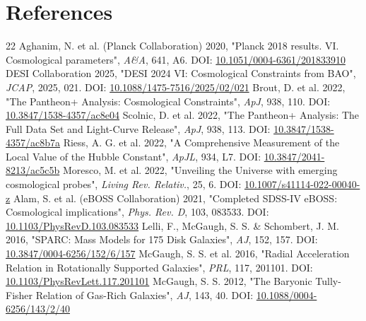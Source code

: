 \documentclass[11pt,a4paper]{article}
\begin{document}
\section{References}
\begin{thebibliography}{22}
 Aghanim, N. et al. (Planck Collaboration) 2020, "Planck 2018 results. VI. Cosmological parameters", \emph{A\&A}, 641, A6. DOI: \href{https://doi.org/10.1051/0004-6361/201833910}{10.1051/\allowbreak{}0004-6361/\allowbreak{}201833910}
 DESI Collaboration 2025, "DESI 2024 VI: Cosmological Constraints from BAO", \emph{JCAP}, 2025, 021. DOI: \href{https://doi.org/10.1088/1475-7516/2025/02/021}{10.1088/\allowbreak{}1475-7516/\allowbreak{}2025/\allowbreak{}02/\allowbreak{}021}
 Brout, D. et al. 2022, "The Pantheon+ Analysis: Cosmological Constraints", \emph{ApJ}, 938, 110. DOI: \href{https://doi.org/10.3847/1538-4357/ac8e04}{10.3847/\allowbreak{}1538-4357/\allowbreak{}ac8e04}
 Scolnic, D. et al. 2022, "The Pantheon+ Analysis: The Full Data Set and Light-Curve Release", \emph{ApJ}, 938, 113. DOI: \href{https://doi.org/10.3847/1538-4357/ac8b7a}{10.3847/\allowbreak{}1538-4357/\allowbreak{}ac8b7a}
 Riess, A. G. et al. 2022, "A Comprehensive Measurement of the Local Value of the Hubble Constant", \emph{ApJL}, 934, L7. DOI: \href{https://doi.org/10.3847/2041-8213/ac5c5b}{10.3847/\allowbreak{}2041-8213/\allowbreak{}ac5c5b}
 Moresco, M. et al. 2022, "Unveiling the Universe with emerging cosmological probes", \emph{Living Rev. Relativ.}, 25, 6. DOI: \href{https://doi.org/10.1007/s41114-022-00040-z}{10.1007/\allowbreak{}s41114-022-00040-z}
 Alam, S. et al. (eBOSS Collaboration) 2021, "Completed SDSS-IV eBOSS: Cosmological implications", \emph{Phys. Rev. D}, 103, 083533. DOI: \href{https://doi.org/10.1103/PhysRevD.103.083533}{10.1103/\allowbreak{}PhysRevD.103.083533}
 Lelli, F., McGaugh, S. S. \& Schombert, J. M. 2016, "SPARC: Mass Models for 175 Disk Galaxies", \emph{AJ}, 152, 157. DOI: \href{https://doi.org/10.3847/0004-6256/152/6/157}{10.3847/\allowbreak{}0004-6256/\allowbreak{}152/\allowbreak{}6/\allowbreak{}157}
 McGaugh, S. S. et al. 2016, "Radial Acceleration Relation in Rotationally Supported Galaxies", \emph{PRL}, 117, 201101. DOI: \href{https://doi.org/10.1103/PhysRevLett.117.201101}{10.1103/\allowbreak{}PhysRevLett.117.201101}
 McGaugh, S. S. 2012, "The Baryonic Tully-Fisher Relation of Gas-Rich Galaxies", \emph{AJ}, 143, 40. DOI: \href{https://doi.org/10.1088/0004-6256/143/2/40}{10.1088/\allowbreak{}0004-6256/\allowbreak{}143/\allowbreak{}2/\allowbreak{}40}

\end{thebibliography}
\end{document}
